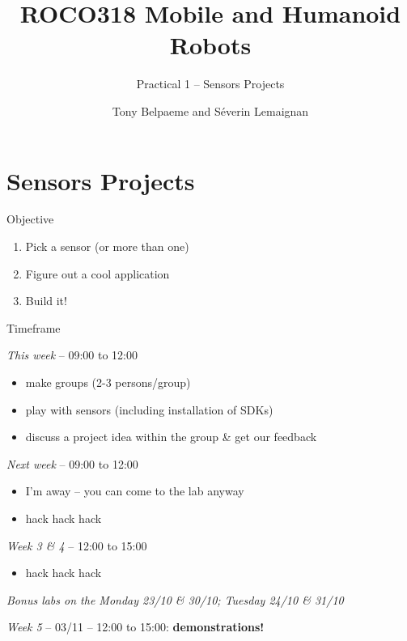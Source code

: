 \documentclass[compress]{beamer}
\title{ROCO318 \newline Mobile and Humanoid Robots}
\subtitle{Practical 1 -- Sensors Projects}
\date{}
\author{Tony Belpaeme and Séverin Lemaignan}
\institute{Centre for Neural Systems and Robotics\\{\bf Plymouth University}}
\providecommand{\tightlist}{%
  \setlength{\itemsep}{0pt}\setlength{\parskip}{0pt}}
\begin{document}

\maketitle

\section{Sensors Projects}\label{sensors-projects}

\begin{frame}{Objective}

\begin{enumerate}
\def\labelenumi{\arabic{enumi}.}
\tightlist
\item
  Pick a sensor (or more than one)
\item
  Figure out a cool application
\item
  Build it!
\end{enumerate}

\end{frame}


\begin{frame}{Timeframe}

    \emph{This week} -- 09:00 to 12:00

\begin{itemize}
\tightlist
\item
  make groups (2-3 persons/group)
\item
  play with sensors (including installation of SDKs)
\item discuss a project idea within the group \& get our feedback
\end{itemize}

\emph{Next week} -- 09:00 to 12:00

\begin{itemize}
\tightlist
\item I'm away -- you can come to the lab anyway
\item hack hack hack
\end{itemize}

\emph{Week 3 \& 4} -- 12:00 to 15:00

\begin{itemize}
\tightlist
\item
  hack hack hack
\end{itemize}

\emph{Bonus labs on the Monday 23/10 \& 30/10; Tuesday 24/10 \& 31/10}

    \emph{Week 5} -- 03/11 -- 12:00 to 15:00: \textbf{demonstrations!}

\end{frame}
\end{document}
